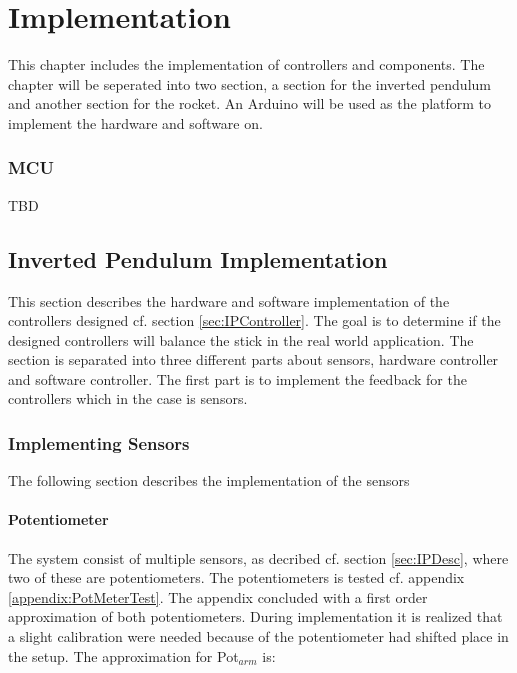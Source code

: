 \chapter{Implementation}
This chapter includes the implementation of controllers and components. The chapter will be seperated into two section, a section for the inverted pendulum and another section for the rocket. An Arduino will be used as the platform to implement the hardware and software on.    


\subsection{MCU}\label{sec:MCU}
TBD


\section{Inverted Pendulum Implementation}\label{sec:InvPendImp}
This section describes the hardware and software implementation of the controllers designed cf. section \ref{sec:IPController}. The goal is to determine if the designed controllers will balance the stick in the real world application. The section is separated into three different parts about sensors, hardware controller and software controller. The first part is to implement the feedback for the controllers which in the case is sensors. 

\subsection{Implementing Sensors}
The following section describes the implementation of the sensors   


\subsubsection*{Potentiometer}\label{section:PotmeterImplementation}
The system consist of multiple sensors, as decribed cf. section \ref{sec:IPDesc}, where two of these are potentiometers. The potentiometers is tested cf. appendix \ref{appendix:PotMeterTest}. The appendix concluded with a first order approximation of both potentiometers. During implementation it is realized that a slight calibration were needed because of the potentiometer had shifted place in the setup. The approximation for Pot$_{arm}$ is:

